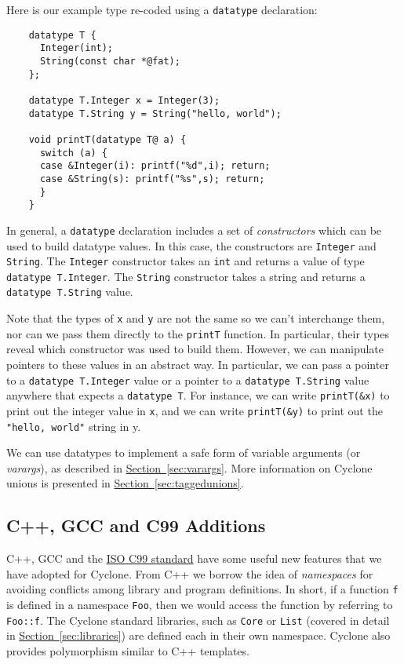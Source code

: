 Here is our example type re-coded using a \texttt{datatype} declaration:
\begin{verbatim}
    datatype T {
      Integer(int);
      String(const char *@fat);
    };

    datatype T.Integer x = Integer(3);
    datatype T.String y = String("hello, world");

    void printT(datatype T@ a) {
      switch (a) {
      case &Integer(i): printf("%d",i); return;
      case &String(s): printf("%s",s); return;
      }
    }
\end{verbatim}
In general, a \texttt{datatype} declaration includes a set of
\emph{constructors} which can be used to build datatype values.
In this case, the constructors are \texttt{Integer} and \texttt{String}.
The \texttt{Integer} constructor takes an \texttt{int} and returns
a value of type \texttt{datatype T.Integer}.  The \texttt{String}
constructor takes a string and returns a \texttt{datatype T.String}
value.  

Note that the types of \texttt{x} and \texttt{y} are not 
the same so we can't interchange them, nor can we pass them
directly to the \texttt{printT} function.  In particular,
their types reveal which constructor was used to build
them.  However, we can manipulate pointers to these values
in an abstract way.  In particular, 
we can pass a pointer to a \texttt{datatype T.Integer} value
or a pointer to a \texttt{datatype T.String} value 
anywhere that expects a \texttt{datatype T}.  For instance,
we can write \texttt{printT(\&x)} to print out the integer 
value in \texttt{x}, and we can write \texttt{printT(\&y)}
to print out the \texttt{"hello, world"} string in y.

We can use datatypes to implement a safe form of variable arguments
(or \emph{varargs}), as described in
\hyperref[{sec:varargs}]{Section~\ref{sec:varargs}}.  More information
on Cyclone unions is presented in
\hyperref[{sec:taggedunions}]{Section~\ref{sec:taggedunions}}.

\subsection{C++, GCC and C99 Additions}

C++, GCC and the
\href{http://web.onetelnet.ch/~twolf/tw/c/c9x_changes.html}{ISO C99
  standard} have some useful new features that we have adopted for
Cyclone.  From C++ we borrow the idea of \emph{namespaces} for
avoiding conflicts among library and program definitions.  In short,
if a function \texttt{f} is defined in a namespace \texttt{Foo}, then
we would access the function by referring to \texttt{Foo::f}.  The
Cyclone standard libraries, such as \texttt{Core} or \texttt{List}
(covered in detail in
\hyperref[{sec:libraries}]{Section~\ref{sec:libraries}}) are defined
each in their own namespace.  Cyclone also provides polymorphism
similar to C++ templates.

